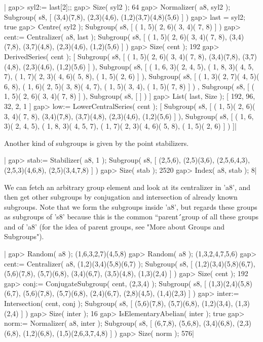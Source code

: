 |    gap> syl2:= last[2];;
    gap> Size( syl2 );
    64
    gap> Normalizer( a8, syl2 );
    Subgroup( s8, [ (3,4)(7,8), (2,3)(4,6), (1,2)(3,7)(4,8)(5,6) ] )
    gap> last = syl2;
    true
    gap> Centre( syl2 );
    Subgroup( s8, [ ( 1, 5)( 2, 6)( 3, 4)( 7, 8) ] )
    gap> cent:= Centralizer( a8, last );
    Subgroup( s8, [ ( 1, 5)( 2, 6)( 3, 4)( 7, 8), (3,4)(7,8), (3,7)(4,8),
      (2,3)(4,6), (1,2)(5,6) ] )
    gap> Size( cent );
    192
    gap> DerivedSeries( cent );
    [ Subgroup( s8, [ ( 1, 5)( 2, 6)( 3, 4)( 7, 8), (3,4)(7,8),
          (3,7)(4,8), (2,3)(4,6), (1,2)(5,6) ] ),
      Subgroup( s8, [ ( 1, 6, 3)( 2, 4, 5), ( 1, 8, 3)( 4, 5, 7),
          ( 1, 7)( 2, 3)( 4, 6)( 5, 8), ( 1, 5)( 2, 6) ] ),
      Subgroup( s8, [ ( 1, 3)( 2, 7)( 4, 5)( 6, 8),
          ( 1, 6)( 2, 5)( 3, 8)( 4, 7), ( 1, 5)( 3, 4), ( 1, 5)( 7, 8) ] )
        , Subgroup( s8, [ ( 1, 5)( 2, 6)( 3, 4)( 7, 8) ] ),
      Subgroup( s8, [  ] ) ]
    gap> List( last, Size );
    [ 192, 96, 32, 2, 1 ]
    gap> low:= LowerCentralSeries( cent );
    [ Subgroup( s8, [ ( 1, 5)( 2, 6)( 3, 4)( 7, 8), (3,4)(7,8),
          (3,7)(4,8), (2,3)(4,6), (1,2)(5,6) ] ),
      Subgroup( s8, [ ( 1, 6, 3)( 2, 4, 5), ( 1, 8, 3)( 4, 5, 7),
          ( 1, 7)( 2, 3)( 4, 6)( 5, 8), ( 1, 5)( 2, 6) ] ) ]|

Another kind of subgroups is given by the point stabilizers.

|    gap> stab:= Stabilizer( a8, 1 );
    Subgroup( s8, [ (2,5,6), (2,5)(3,6), (2,5,6,4,3), (2,5,3)(4,6,8),
      (2,5)(3,4,7,8) ] )
    gap> Size( stab );
    2520
    gap> Index( a8, stab );
    8|

We  can  fetch an arbitrary group element and  look at its centralizer in
'a8',  and then get  other subgroups by  conjugation  and intersection of
already  known subgroups.  Note that  we form  the subgroups inside 'a8',
but {\GAP} regards these groups as subgroups  of 's8' because this is the
common  ``parent\'\'\ group of all these groups and of 'a8' (for the idea
of parent groups, see "More about Groups and Subgroups").

|    gap> Random( a8 );
    (1,6,3,2,7)(4,5,8)
    gap> Random( a8 );
    (1,3,2,4,7,5,6)
    gap> cent:= Centralizer( a8, (1,2)(3,4)(5,8)(6,7) );
    Subgroup( s8, [ (1,2)(3,4)(5,8)(6,7), (5,6)(7,8), (5,7)(6,8),
      (3,4)(6,7), (3,5)(4,8), (1,3)(2,4) ] )
    gap> Size( cent );
    192
    gap> conj:= ConjugateSubgroup( cent, (2,3,4) );
    Subgroup( s8, [ (1,3)(2,4)(5,8)(6,7), (5,6)(7,8), (5,7)(6,8),
      (2,4)(6,7), (2,8)(4,5), (1,4)(2,3) ] )
    gap> inter:= Intersection( cent, conj );
    Subgroup( s8, [ (5,6)(7,8), (5,7)(6,8), (1,2)(3,4), (1,3)(2,4) ] )
    gap> Size( inter );
    16
    gap> IsElementaryAbelian( inter );
    true
    gap> norm:= Normalizer( a8, inter );
    Subgroup( s8, [ (6,7,8), (5,6,8), (3,4)(6,8), (2,3)(6,8), (1,2)(6,8),
      (1,5)(2,6,3,7,4,8) ] )
    gap> Size( norm );
    576|


